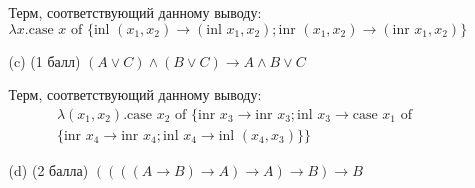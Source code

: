 \begin{enumerate}
\begin{itemize}
\begin{solution}
\begin{prooftree}
      \end{prooftree}
      Терм, соответствующий данному выводу:
      \begin{equation}
        \lambda x. \text{case } x \text{ of } \{\text{inl } (x_1, x_2) \rightarrow (\text{inl } x_1, x_2); \text{inr } (x_1, x_2) \rightarrow (\text{inr } x_1, x_2)\}
      \end{equation}
    \end{solution}
    \item[(c)] (1 балл) $(A \lor C) \land (B \lor C) \rightarrow A \land B \lor C$
    \begin{solution}
      \hspace{0.01cm}
      \begin{prooftree}
      \end{prooftree}
      Терм, соответствующий данному выводу:
      \begin{eqnarray}
        \lambda (x_1, x_2). \text{case } x_2 \text{ of } \{\text{inr } x_3 \rightarrow \text{inr } x_3; \text{inl } x_3 \rightarrow \text{case } x_1 \text{ of } \\\{\text{inr } x_4 \rightarrow \text{inr } x_4;\text{inl } x_4 \rightarrow \text{inl } (x_4, x_3)\}\}
      \end{eqnarray}
    \end{solution}
    \item[(d)] (2 балла) $((((A \rightarrow B) \rightarrow A) \rightarrow A) \rightarrow B) \rightarrow B$

\end{itemize}
\end{enumerate}
